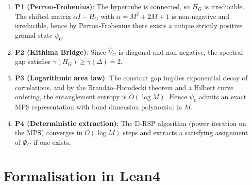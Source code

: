 \documentclass[11pt,a4paper]{article}
\begin{document}
\begin{enumerate}
\item \textbf{P1 (Perron‑Frobenius)}: The hypercube is connected, so \(H_G\) is irreducible. The shifted matrix \(\alpha I - H_G\) with \(\alpha = M^2 + 2M + 1\) is non‑negative and irreducible, hence by Perron‑Frobenius there exists a unique strictly positive ground state \(\psi_0\).
\item \textbf{P2 (Kithima Bridge)}: Since \(\hat{V}_G\) is diagonal and non‑negative, the spectral gap satisfies \(\gamma(H_G) \ge \gamma(\Delta) = 2\).
\item \textbf{P3 (Logarithmic area law)}: The constant gap implies exponential decay of correlations, and by the Brandão–Horodecki theorem and a Hilbert curve ordering, the entanglement entropy is \(O(\log M)\). Hence \(\psi_0\) admits an exact MPS representation with bond dimension polynomial in \(M\).
\item \textbf{P4 (Deterministic extraction)}: The D‑RSP algorithm (power iteration on the MPS) converges in \(O(\log M)\) steps and extracts a satisfying assignment of \(\Phi_G\) if one exists.
\end{enumerate}

\section{Formalisation in Lean4}
\end{document}
